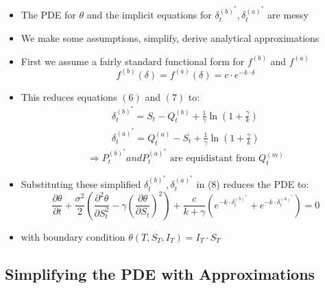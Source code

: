 \documentclass[10pt]{article}
\begin{document}
\begin{itemize} 
    \item The PDE for $\theta$ and the implicit equations for $\delta_{t}^{(b)^{*}}, \delta_{t}^{(a)^{*}}$ are messy
    \item We make some assumptions, simplify, derive analytical approximations
    \item First we assume a fairly standard functional form for $f^{(b)}$ and $f^{(a)}$
    $$
    f^{(b)}(\delta)=f^{(a)}(\delta)=c \cdot e^{-k \cdot \delta}
    $$
    \item This reduces equations $(6)$ and $(7)$ to:
    \[
    \begin{array}{l}
    \delta_{t}^{(b)^{*}}=S_{t}-Q_{t}^{(b)}+\frac{1}{\gamma} \ln \left(1+\frac{\gamma}{k}\right) \tag{11,12} \\
    \delta_{t}^{(a)^{*}}=Q_{t}^{(a)}-S_{t}+\frac{1}{\gamma} \ln \left(1+\frac{\gamma}{k}\right)
    \end{array}
    \]
    $$
    \Rightarrow P_{t}^{(b)^{*}} and P_{t}^{(a)^{*}} \text { are equidistant from } Q_{t}^{(m)}
    $$
    \item Substituting these simplified $\delta_{t}^{(b)^{*}}, \delta_{t}^{(a)^{*}}$ in (8) reduces the PDE to:
    \[
    \frac{\partial \theta}{\partial t}+\frac{\sigma^{2}}{2}\left(\frac{\partial^{2} \theta}{\partial S_{t}^{2}}-\gamma\left(\frac{\partial \theta}{\partial S_{t}}\right)^{2}\right)+\frac{c}{k+\gamma}\left(e^{-k \cdot \delta_{t}^{(b)^{*}}}+e^{-k \cdot \delta_{t}^{(a)^{*}}}\right)=0 \tag{13}
    \]
    \item with boundary condition $\theta\left(T, S_{T}, I_{T}\right)=I_{T} \cdot S_{T}$
\end{itemize}

\subsection{Simplifying the PDE with Approximations}
\end{document}

